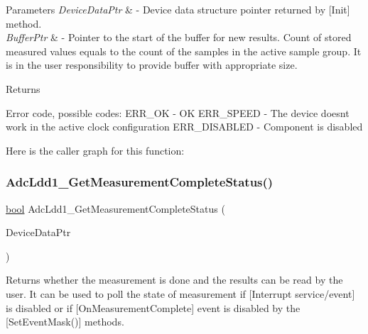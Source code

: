 \begin{DoxyParams}{Parameters}
{\em Device\+Data\+Ptr} & -\/ Device data structure pointer returned by \mbox{[}Init\mbox{]} method. \\
\hline
{\em Buffer\+Ptr} & -\/ Pointer to the start of the buffer for new results. Count of stored measured values equals to the count of the samples in the active sample group. It is in the user responsibility to provide buffer with appropriate size. \\
\hline
\end{DoxyParams}
\begin{DoxyReturn}{Returns}

\begin{DoxyItemize}
\item Error code, possible codes\+: E\+R\+R\+\_\+\+OK -\/ OK E\+R\+R\+\_\+\+S\+P\+E\+ED -\/ The device doesn\textquotesingle{}t work in the active clock configuration E\+R\+R\+\_\+\+D\+I\+S\+A\+B\+L\+ED -\/ Component is disabled 
\end{DoxyItemize}
\end{DoxyReturn}
Here is the caller graph for this function\+:
\mbox{\label{group___adc_ldd1__module_ga4df44002c6ba3479f104deedd98b7e4e}} 
\subsubsection{\texorpdfstring{Adc\+Ldd1\+\_\+\+Get\+Measurement\+Complete\+Status()}{AdcLdd1\_GetMeasurementCompleteStatus()}}
{\footnotesize\ttfamily \hyperlink{group___p_e___types__module_ga97a80ca1602ebf2303258971a2c938e2}{bool} Adc\+Ldd1\+\_\+\+Get\+Measurement\+Complete\+Status (\begin{DoxyParamCaption}\item[{\hyperlink{group___p_e___types__module_gac5cf1362f1f0e3a2ce71b1bf2276d091}{L\+D\+D\+\_\+\+T\+Device\+Data} $\ast$}]{Device\+Data\+Ptr }\end{DoxyParamCaption})}



Returns whether the measurement is done and the results can be read by the user. It can be used to poll the state of measurement if \mbox{[}Interrupt service/event\mbox{]} is disabled or if \mbox{[}On\+Measurement\+Complete\mbox{]} event is disabled by the \mbox{[}Set\+Event\+Mask()\mbox{]} methods. 


